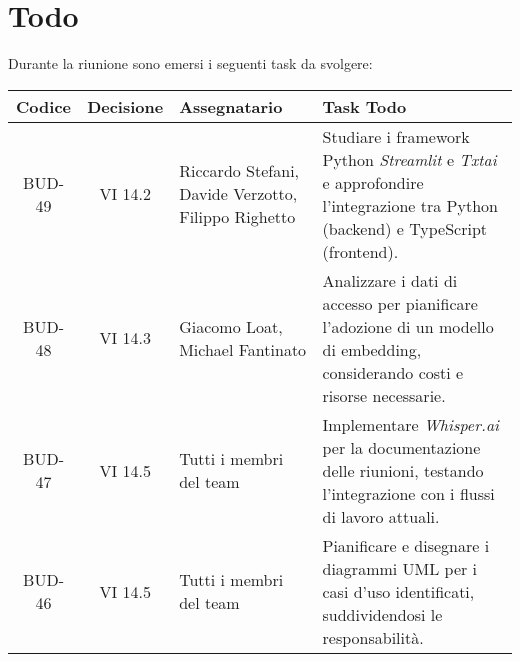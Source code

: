 \section{Todo}

Durante la riunione sono emersi i seguenti task da svolgere:

\vspace{0.5cm}

\begin{table}[htbp]
    \centering
    \begin{tabular}{|c|c|p{}|p{}|}
        \hline
        \rowcolor[gray]{0.75}
        \textbf{Codice} & \textbf{Decisione} & \textbf{Assegnatario} & \textbf{Task Todo} \\
        \hline
        BUD-49 & VI 14.2 & Riccardo Stefani, Davide Verzotto, Filippo Righetto & Studiare i framework Python \emph{Streamlit} e \emph{Txtai} e approfondire l'integrazione tra Python (backend) e TypeScript (frontend). \\
        \hline
        BUD-48 & VI 14.3 & Giacomo Loat, Michael Fantinato & Analizzare i dati di accesso per pianificare l’adozione di un modello di embedding, considerando costi e risorse necessarie. \\
        \hline
        BUD-47 & VI 14.5 & Tutti i membri del team & Implementare \emph{Whisper.ai} per la documentazione delle riunioni, testando l'integrazione con i flussi di lavoro attuali. \\
        \hline
        BUD-46 & VI 14.5 & Tutti i membri del team & Pianificare e disegnare i diagrammi UML per i casi d'uso identificati, suddividendosi le responsabilità. \\
        \hline
    \end{tabular}
\end{table}
